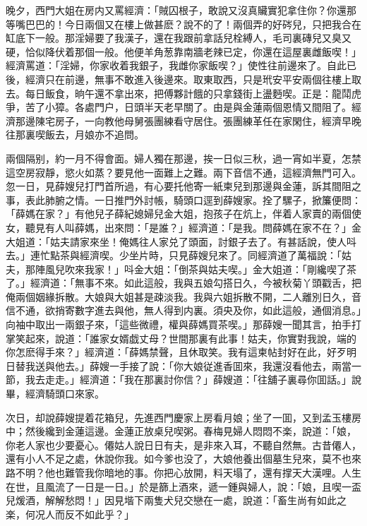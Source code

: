 晚夕，西門大姐在房内又罵經濟：「賊囚根子，敢說又沒真贜實犯拿住你？你還那等嘴巴巴的！今日兩個又在樓上做甚麽？說不的了！兩個弄的好硶兒，只把我合在缸底下一般。那淫婦要了我漢子，還在我跟前拿話兒栓縛人，毛司裏磚兒又臭又硬，恰似降伏着那個一般。他便羊角葱靠南牆老辣已定，你還在這屋裏雌飯喫！」經濟罵道：「淫婦，你家收着我銀子，我雌你家飯喫？」使性往前邊來了。自此已後，經濟只在前邊，無事不敢進入後邊來。取東取西，只是玳安平安兩個往樓上取去。每日飯食，晌午還不拿出來，把傅夥計餓的只拿錢街上盪麪喫。正是：龍鬦虎爭，苦了小獐。各處門户，日頭半天老早關了。由是與金蓮兩個恩情又間阻了。經濟那邊陳宅房子，一向教他母舅張團練看守居住。張團練革任在家閑住，經濟早晚往那裏喫飯去，月娘亦不追問。

兩個隔别，約一月不得會面。婦人獨在那邊，挨一日似三秋，過一宵如半夏，怎禁這空房寂靜，慾火如蒸？要見他一面難上之難。兩下音信不通，這經濟無門可入。忽一日，見薛嫂兒打門首所過，有心要托他寄一紙柬兒到那邊與金蓮，訴其間阻之事，表此肺腑之情。一日推門外討帳，騎頭口逕到薛嫂家。拴了騾子，掀簾便問：「薛媽在家？」有他兒子薛紀媳婦兒金大姐，抱孩子在炕上，伴着人家賣的兩個使女，聽見有人叫薛媽，出來問：「是誰？」經濟道：「是我。問薛媽在家不在？」金大姐道：「姑夫請家來坐！俺媽往人家兑了頭面，討銀子去了。有甚話說，使人呌去。」連忙點茶與經濟喫。少坐片時，只見薛嫂兒來了。同經濟道了萬福說：「姑夫，那陣風兒吹來我家！」呌金大姐：「倒茶與姑夫喫。」金大姐道：「剛纔喫了茶了。」經濟道：「無事不來。如此這般，我與五娘勾搭日久，今被秋菊丫頭戳舌，把俺兩個姻緣拆散。大娘與大姐甚是疎淡我。我與六姐拆散不開，二人離別日久，音信不通，欲捎寄數字進去與他，無人得到内裏。須央及你，如此這般，通個消息。」向袖中取出一兩銀子來，「這些微禮，權與薛媽買茶喫。」那薛嫂一聞其言，拍手打掌笑起來，說道：「誰家女婿戯丈母？世間那裏有此事！姑夫，你實對我說，端的你怎麽得手來？」經濟道：「薛媽禁聲，且休取笑。我有這柬帖封好在此，好歹明日替我送與他去。」薛嫂一手接了說：「你大娘従進香囬來，我還沒看他去，兩當一節，我去走走。」經濟道：「我在那裏討你信？」薛嫂道：「往舖子裏尋你囬話。」說畢，經濟騎頭口來家。

次日，却說薛嫂提着花箱兒，先進西門慶家上房看月娘；坐了一囬，又到孟玉樓房中；然後纔到金蓮這邊。金蓮正放桌兒喫粥。春梅見婦人悶悶不楽，說道：「娘，你老人家也少要憂心。僊姑人說日日有夫，是非來入耳，不聽自然無。古昔僊人，還有小人不足之處，休說你我。如今爹也没了，大娘他養出個墓生兒來，莫不也來路不明？他也難管我你暗地的事。你把心放開，料天塌了，還有撑天大漢哩。人生在世，且風流了一日是一日。」於是篩上酒來，遞一鍾與婦人，說：「娘，且喫一盃兒煖酒，解解愁悶！」因見堦下兩隻犬兒交戀在一處，說道：「畜生尚有如此之楽，何况人而反不如此乎？」


